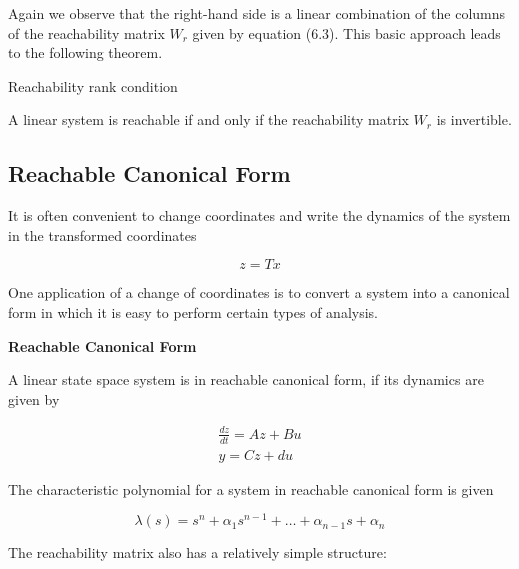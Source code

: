 Again we observe that the right-hand side is a linear combination of the columns
of the reachability matrix $W_r$ given by equation (6.3). This basic approach leads to
the following theorem.


\begin{framed}
\theoremstyle{theorem}
\begin{theorem}{Reachability rank condition}

 A linear system is reachable if and
only if the reachability matrix $W_r$ is invertible.

\end{theorem}
\end{framed}


\subsection{Reachable Canonical Form}

It is often convenient to change coordinates and write the dynamics of the system in the transformed coordinates

\begin{equation}
z = Tx
\end{equation}

One application of a change of coordinates is to convert a system into a
canonical form in which it is easy to perform certain types of analysis.


\begin{framed}
\theoremstyle{remark}
\begin{remark}{\textbf{Reachable Canonical Form}}

A linear state space system is in reachable canonical form, if its dynamics are given by

\begin{eqnarray}
\frac{dz}{dt} = Az + Bu \\
y=Cz + du
\end{eqnarray}

\end{remark}
\end{framed}

The characteristic polynomial for a system in reachable canonical form is given

\begin{equation}
\lambda(s) = s^n +\alpha_1s^{n-1}+ \dots + \alpha_{n-1}s + \alpha_n
\end{equation}

The reachability matrix also has a relatively simple structure:

